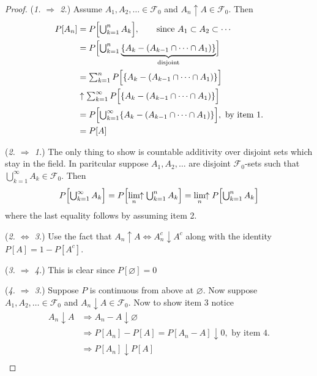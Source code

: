 \begin{proof}
({\sl 1. $\Longrightarrow $ 2.}) Assume $A_1, A_2, \ldots \in \mathcal F_0$ and $A_n\uparrow A\in\mathcal F_0$. Then
 \begin{align*}
 P[A_n] &= P\Bigl[ \textstyle\bigcup_{k=1}^n A_k \Bigr],\qquad\text{since $A_1\subset A_2\subset \cdots$}\\
 &= P\Bigl[ \textstyle\bigcup_{k=1}^n \underbrace{\{A_k - (A_{k-1}\cap \cdots \cap A_1)\}}_{\text{disjoint}} \Bigr] \\
 &= \textstyle\sum_{k=1}^nP\Bigl[ \{A_k - (A_{k-1}\cap \cdots \cap A_1)\} \Bigr] \\
 &\uparrow \textstyle\sum_{k=1}^\infty P\Bigl[ \{A_k - (A_{k-1}\cap \cdots \cap A_1)\} \Bigr] \\
 &=P\Bigl[ \textstyle\bigcup_{k=1}^\infty \{ A_k - (A_{k-1}\cap \cdots \cap A_1)\} \Bigr],\,\,\text{by item 1.}\\
 &=P[ A ]
 \end{align*}


({\sl 2. $\Longrightarrow $ 1.}) The only thing to show is countable additivity over disjoint sets which stay in the field. In paritcular suppose $A_1, A_2, \ldots $ are disjoint $\mathcal F_0$-sets  such that $\textstyle\bigcup_{k=1}^\infty A_k \in \mathcal F_0$. Then
\begin{align*}
P\Bigl[\textstyle\bigcup_{k=1}^\infty A_k \Bigr]= P\Bigl[\displaystyle\lim_{n}\!\!\uparrow\textstyle\bigcup_{k=1}^n A_k \Bigr] = \displaystyle\lim_{n}\!\!\uparrow P\Bigl[\textstyle\bigcup_{k=1}^n A_k \Bigr]
 \end{align*}
 where the last equality follows by assuming item 2.


 ({\sl 2. $\Longleftrightarrow $ 3.}) Use the fact that $A_n\uparrow A \Longleftrightarrow A_n^c \downarrow A^c$ along with the identity $P[A] = 1- P[A^c]$.


 ({\sl 3. $\Longrightarrow $ 4.}) This is clear since $P[\varnothing ]=0$

 ({\sl 4. $\Longrightarrow $ 3.}) Suppose $P$ is continuous from above at $\varnothing$. Now suppose  $A_1, A_2, \ldots \in \mathcal F_0$ and $A_n\downarrow A\in\mathcal F_0$. Now to show item 3 notice
 \begin{align*}
 A_n\downarrow A
 &\Longrightarrow A_n-A \downarrow \varnothing \\
 &\Longrightarrow P[A_n]-P[A] = P[A_n-A]   \downarrow 0,\,\,\text{by item 4.} \\
 &\Longrightarrow P[A_n] \downarrow P[A]  \\
 \end{align*}
\end{proof}

